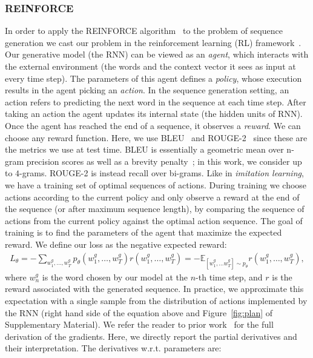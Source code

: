 \subsubsection{REINFORCE} \label{model-reinforce}
In order to apply the REINFORCE algorithm~\citep{reinforce, zaremba-arxiv2015} to the problem of sequence generation we cast our problem in the reinforcement learning (RL) framework~\citep{sutton-rl}. Our generative model (the RNN) can be viewed as an {\em agent}, which interacts with the external environment (the words and the context vector it sees as input at every time step). The parameters of this agent defines a {\em policy}, whose execution results in the agent picking an {\em action}. In the sequence generation setting, an action refers to predicting the next word in the sequence at each time step. 
After taking an action the agent updates its internal state (the hidden units of RNN). Once the agent has reached the end of a sequence, it observes a {\em reward}. We can choose any reward function. Here, we use BLEU~\citep{bleu} and ROUGE-2~\citep{rouge} since these are the metrics we use at test time. BLEU is essentially a geometric mean over n-gram precision scores  as well as a brevity penalty~\citep{liang2006}; in this work, we consider up to $4$-grams. ROUGE-2 is instead recall over bi-grams. 
Like in {\em imitation learning}, we have a training set of optimal sequences of actions. 
During training we choose actions according to the current policy and only observe a reward at the end of the sequence (or after maximum sequence length), by comparing the sequence of actions from the current policy against the optimal action sequence.
The goal of training is to find the parameters of the agent that maximize the expected reward.
We define our loss as the negative expected reward:
\begin{align}
L_{\theta} = - \sum_{w^g_1, \dots, w^g_T} p_\theta(w^g_1, \dots,
w^g_T) r(w^g_1, \dots, w^g_T) = -\mathbb{E}_{[w_1^g, \dots w^g_T] \sim p_\theta} r(w^g_1, \dots, w^g_T), \label{eq:reinforce-loss}
\end{align}
where $w^g_n$ is the word chosen by our model at the $n$-th time step, and $r$ is the reward associated with the generated sequence. 
In practice, we approximate this expectation with a single sample
from the distribution of actions implemented by the RNN (right hand side of the equation above and Figure~\ref{fig:plan} of Supplementary Material). 
We refer the reader to prior work~\citep{zaremba-arxiv2015,reinforce} for the full derivation of the gradients. Here, we directly report the partial derivatives and their interpretation. The derivatives w.r.t. parameters are:
